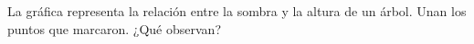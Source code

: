 La gráfica representa la relación entre la sombra y la altura de un árbol. Unan los
puntos que marcaron. ¿Qué observan?